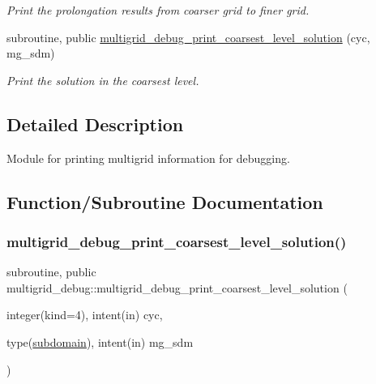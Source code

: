 \begin{DoxyCompactItemize}
\begin{DoxyCompactList}\small\item\em Print the prolongation results from coarser grid to finer grid. \end{DoxyCompactList}\item 
subroutine, public \hyperlink{namespacemultigrid__debug_ad5c036138c7fd5e103641a667a88e6cf}{multigrid\+\_\+debug\+\_\+print\+\_\+coarsest\+\_\+level\+\_\+solution} (cyc, mg\+\_\+sdm)
\begin{DoxyCompactList}\small\item\em Print the solution in the coarsest level. \end{DoxyCompactList}\end{DoxyCompactItemize}


\subsection{Detailed Description}
Module for printing multigrid information for debugging. 

\subsection{Function/\+Subroutine Documentation}
\mbox{\label{namespacemultigrid__debug_ad5c036138c7fd5e103641a667a88e6cf}} 
\subsubsection{\texorpdfstring{multigrid\+\_\+debug\+\_\+print\+\_\+coarsest\+\_\+level\+\_\+solution()}{multigrid\_debug\_print\_coarsest\_level\_solution()}}
{\footnotesize\ttfamily subroutine, public multigrid\+\_\+debug\+::multigrid\+\_\+debug\+\_\+print\+\_\+coarsest\+\_\+level\+\_\+solution (\begin{DoxyParamCaption}\item[{integer(kind=4), intent(in)}]{cyc,  }\item[{type(\hyperlink{structgeometry_1_1subdomain}{subdomain}), intent(in)}]{mg\+\_\+sdm }\end{DoxyParamCaption})}




